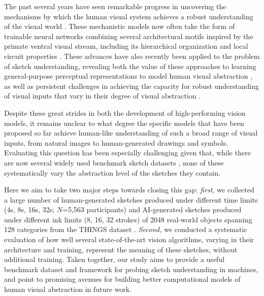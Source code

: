 \documentclass[10pt,letterpaper]{article}
\begin{document}
The past several years have seen remarkable progress in uncovering the mechanisms by which the human visual system achieves a robust understanding of the visual world \cite{yamins2014performance, kriegeskorte2015deep, zhuang2021unsupervised, konkle2022self}. 
These mechanistic models now often take the form of trainable neural networks combining several architectural motifs inspired by the primate ventral visual stream, including its hierarchical organization and local circuit properties \cite{gross1972visual,goodale1992separate,malach2002topography,hung2005fast}. %
These advances have also recently been applied to the problem of sketch understanding, revealing both the value of these approaches to learning general-purpose perceptual representations to model human visual abstraction \cite{fan2018common, yu2017sketch, kubilius2016deep}, as well as persistent challenges in achieving the capacity for robust understanding of visual inputs that vary in their degree of visual abstraction \cite{baker2018abstract, singer2022photos, fan2020pragmatic}.



Despite these great strides in both the development of high-performing vision models, it remains unclear to what degree the specific models that have been proposed so far achieve human-like understanding of such a broad range of visual inputs, from natural images to human-generated drawings and symbols.
Evaluating this question has been especially challenging given that, while there are now several widely used benchmark sketch datasets \cite{eitz2012sketch, jongejan2017quick, sangkloy2016sketchy}, none of these systematically vary the abstraction level of the sketches they contain. 

Here we aim to take two major steps towards closing this gap: \textit{first,} we collected a large number of human-generated sketches produced under different time limits (4s, 8s, 16s, 32s; $N$=5,563 participants) and AI-generated sketches \cite{vinker2022clipasso} produced under different ink limits (8, 16, 32 strokes) of 2048 real-world objects spanning 128 categories from the THINGS dataset \cite{hebart2019things}. \textit{Second,} we conducted a systematic evaluation of how well several state-of-the-art vision algorithms, varying in their architecture and training, represent the meaning of these sketches, without additional training.
Taken together, our study aims to provide a useful benchmark dataset and framework for probing sketch understanding in machines, and point to promising avenues for building better computational models of human visual abstraction in future work.
\end{document}
